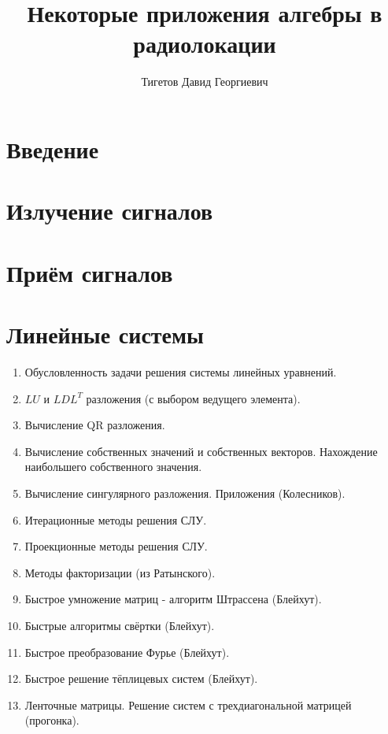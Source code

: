 \documentclass[a4paper,12pt]{report}
\begin{document}
    \title{Некоторые приложения алгебры в радиолокации}
    \author{Тигетов Давид Георгиевич}
    \maketitle

    \tableofcontents

    


    \part{Введение}
    
    


    \part{Излучение сигналов}
    
    
    


    \part{Приём сигналов}
    
    
    
    
    
    

    \part{Линейные системы}

    

    \begin{enumerate}
        \item Обусловленность задачи решения системы линейных уравнений.
        \item $LU$ и $LDL^T$ разложения (с выбором ведущего элемента).
        \item Вычисление QR разложения.
        \item Вычисление собственных значений и собственных векторов. Нахождение наибольшего собственного значения.
        \item Вычисление сингулярного разложения. Приложения (Колесников).
        \item Итерационные методы решения СЛУ.
        \item Проекционные методы решения СЛУ.
        \item Методы факторизации (из Ратынского).
        \item Быстрое умножение матриц - алгоритм Штрассена (Блейхут).
        \item Быстрые алгоритмы свёртки (Блейхут).
        \item Быстрое преобразование Фурье (Блейхут).
        \item Быстрое решение тёплицевых систем (Блейхут).
        \item Ленточные матрицы. Решение систем с трехдиагональной матрицей (прогонка).
    \end{enumerate}
\end{document}
